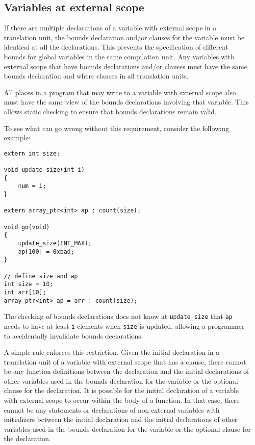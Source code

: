 \subsection{Variables at external scope}
\label{section:external-scope-variables}

If there are multiple declarations of a variable with external scope in
a translation unit, the bounds declaration and/or  clauses for the
variable must be identical at all the declarations. This prevents the
specification of different bounds for global variables in the same
compilation unit. Any variables with external scope that have bounds
declarations and/or  clauses must have the same bounds declaration
and where clauses in all translation units.

All places in a program that may write to a variable with external scope
also must have the same view of the bounds declarations involving that
variable. This allows static checking to ensure that bounds declarations
remain valid.

To see what can go wrong without this requirement, consider the
following example:

\begin{verbatim}
extern int size;

void update_size(int i)
{
    num = i;
}

extern array_ptr<int> ap : count(size);

void go(void)
{
    update_size(INT_MAX);
    ap[100] = 0xbad;
}

// define size and ap
int size = 10;
int arr[10];
array_ptr<int> ap = arr : count(size);
\end{verbatim}

The checking of bounds declarations does not know at
\texttt{update\_size} that \texttt{ap} needs to have at least \texttt{i}
elements when \texttt{size} is updated, allowing a programmer to accidentally
invalidate bounds declarations.

A simple rule enforces this restriction. Given the initial declaration
in a translation unit of a variable with external scope that has a
 clause, there cannot be any function definitions between
the declaration and the initial declarations of other variables used in
the bounds declaration for the variable or the optional  clause for the declaration.
It is possible for the initial declaration of
a variable with external scope to occur within the body of a function.
In that case, there cannot be any statements or declarations of
non-external variables with initializers between the initial declaration
and the initial declarations of other variables used in the
bounds declaration for the variable or the optional  clause for
the declaration.

